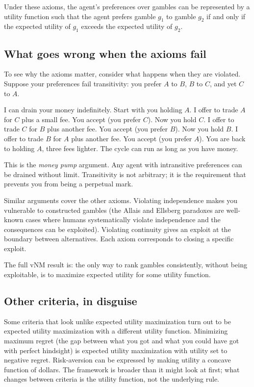 Under these axioms, the agent's preferences over gambles can be represented by a utility function such that the agent prefers gamble $g_1$ to gamble $g_2$ if and only if the expected utility of $g_1$ exceeds the expected utility of $g_2$.

\subsection*{What goes wrong when the axioms fail}

To see why the axioms matter, consider what happens when they are violated. Suppose your preferences fail transitivity: you prefer $A$ to $B$, $B$ to $C$, and yet $C$ to $A$.

I can drain your money indefinitely. Start with you holding $A$. I offer to trade $A$ for $C$ plus a small fee. You accept (you prefer $C$). Now you hold $C$. I offer to trade $C$ for $B$ plus another fee. You accept (you prefer $B$). Now you hold $B$. I offer to trade $B$ for $A$ plus another fee. You accept (you prefer $A$). You are back to holding $A$, three fees lighter. The cycle can run as long as you have money.

This is the \emph{money pump} argument. Any agent with intransitive preferences can be drained without limit. Transitivity is not arbitrary; it is the requirement that prevents you from being a perpetual mark.

Similar arguments cover the other axioms. Violating independence makes you vulnerable to constructed gambles (the Allais and Ellsberg paradoxes are well-known cases where humans systematically violate independence and the consequences can be exploited). Violating continuity gives an exploit at the boundary between alternatives. Each axiom corresponds to closing a specific exploit.

The full vNM result is: the only way to rank gambles consistently, without being exploitable, is to maximize expected utility for some utility function.

\subsection*{Other criteria, in disguise}

Some criteria that look unlike expected utility maximization turn out to be expected utility maximization with a different utility function. Minimizing maximum regret (the gap between what you got and what you could have got with perfect hindsight) is expected utility maximization with utility set to negative regret. Risk-aversion can be expressed by making utility a concave function of dollars. The framework is broader than it might look at first; what changes between criteria is the utility function, not the underlying rule.

